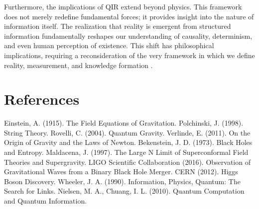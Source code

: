 \documentclass{article}
\begin{document}
Furthermore, the implications of QIR extend beyond physics. This framework does not merely redefine fundamental forces; it provides insight into the nature of information itself. The realization that reality is emergent from structured information fundamentally reshapes our understanding of causality, determinism, and even human perception of existence. This shift has philosophical implications, requiring a reconsideration of the very framework in which we define reality, measurement, and knowledge formation \cite{wheeleritfrombit}.

\section{References}
\begin{thebibliography}{99}
 Einstein, A. (1915). The Field Equations of Gravitation.
 Polchinski, J. (1998). String Theory.
 Rovelli, C. (2004). Quantum Gravity.
 Verlinde, E. (2011). On the Origin of Gravity and the Laws of Newton.
 Bekenstein, J. D. (1973). Black Holes and Entropy.
 Maldacena, J. (1997). The Large N Limit of Superconformal Field Theories and Supergravity.
 LIGO Scientific Collaboration (2016). Observation of Gravitational Waves from a Binary Black Hole Merger.
 CERN (2012). Higgs Boson Discovery.
 Wheeler, J. A. (1990). Information, Physics, Quantum: The Search for Links.
 Nielsen, M. A., Chuang, I. L. (2010). Quantum Computation and Quantum Information.
\end{thebibliography}
\end{document}
